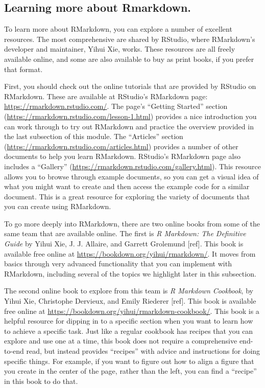 \documentclass[]{tufte-book}
\begin{document}
\hypertarget{learning-more-about-rmarkdown.}{%
\subsection{Learning more about Rmarkdown.}\label{learning-more-about-rmarkdown.}}

To learn more about RMarkdown, you can explore a number of excellent resources.
The most comprehensive are shared by RStudio, where RMarkdown's developer
and maintainer, Yihui Xie, works. These resources are all freely available
online, and some are also available to buy as print books, if you prefer that
format.

First, you should check out the online tutorials that are provided by RStudio on
RMarkdown. These are available at RStudio's RMarkdown page:
\url{https://rmarkdown.rstudio.com/}. The page's ``Getting Started'' section
(\url{https://rmarkdown.rstudio.com/lesson-1.html}) provides a nice introduction you
can work through to try out RMarkdown and practice the overview provided in the
last subsection of this module. The ``Articles'' section
(\url{https://rmarkdown.rstudio.com/articles.html}) provides a number of other
documents to help you learn RMarkdown. RStudio's RMarkdown page also includes a
``Gallery'' (\url{https://rmarkdown.rstudio.com/gallery.html}). This resource allows you
to browse through example documents, so you can get a visual idea of what you
might want to create and then access the example code for a similar document.
This is a great resource for exploring the variety of documents that you can
create using RMarkdown.

To go more deeply into RMarkdown, there are two online books from some of the
same team that are available online. The first is \emph{R Markdown: The Definitive
Guide} by Yihui Xie, J. J. Allaire, and Garrett Grolemund {[}ref{]}. This book is
available free online at \url{https://bookdown.org/yihui/rmarkdown/}. It moves from
basics through very advanced functionality that you can implement with
RMarkdown, including several of the topics we highlight later in this
subsection.

The second online book to explore from this team is \emph{R Markdown Cookbook}, by
Yihui Xie, Christophe Dervieux, and Emily Riederer {[}ref{]}. This book is available
free online at \url{https://bookdown.org/yihui/rmarkdown-cookbook/}. This book is a
helpful resource for dipping in to a specific section when you want to learn how
to achieve a specific task. Just like a regular cookbook has recipes that you
can explore and use one at a time, this book does not require a comprehensive
end-to-end read, but instead provides ``recipes'' with advice and instructions for
doing specific things. For example, if you want to figure out how to align a
figure that you create in the center of the page, rather than the left, you can
find a ``recipe'' in this book to do that.
\end{document}
